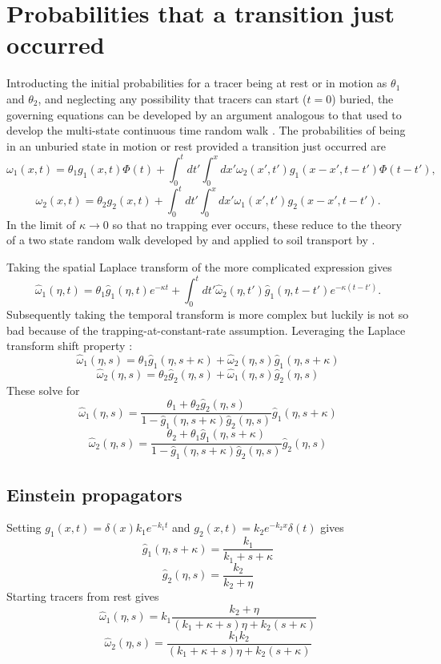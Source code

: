 \documentclass[11pt]{article}
\newcommand\be{\begin{equation}} %
\newcommand\ee{\end{equation}}   %
\begin{document}
\section{Probabilities that a transition just occurred}
Introducting the initial probabilities for a tracer being at rest or in motion as $\theta_1$ and $\theta_2$, and neglecting any possibility that tracers can start ($t=0$) buried, the governing equations can be developed by an argument analogous to that used to develop the multi-state continuous time random walk \citep[e.g.][]{Weiss1994}. The probabilities of being in an unburied state in motion or rest provided a transition just occurred are
\be \omega_1(x,t) = \theta_1 g_1(x,t)\Phi(t) + \int_0^t dt' \int_0^x dx' \omega_2(x',t')g_1(x-x',t-t')\Phi(t-t'), \ee
\be \omega_2(x,t) = \theta_2 g_2(x,t) + \int_0^t dt' \int_0^x dx' \omega_1(x',t')g_2(x-x',t-t').\ee
In the limit of $\kappa \rightarrow 0$ so that no trapping ever occurs, these reduce to the theory of a two state random walk developed by \citet{Weiss1976} and applied to soil transport by \citet{Lisle1998}.

Taking the spatial Laplace transform of the more complicated expression gives
\be \hat{\omega}_1(\eta,t) = \theta_1 \hat{g}_1(\eta,t)e^{-\kappa t} + \int_0^t dt' \hat{\omega}_2(\eta,t')\hat{g}_1(\eta,t-t')e^{-\kappa(t-t')}. \ee
Subsequently taking the temporal transform is more complex but luckily is not so bad because of the trapping-at-constant-rate assumption. Leveraging the Laplace transform shift property \citep[e.g.][]{Arfken1985}:
\be 
\hat{\omega}_1(\eta,s) = \theta_1 \hat{g}_1(\eta, s + \kappa) + \hat{\omega}_2(\eta,s)\hat{g}_1(\eta,s+\kappa)
\ee
\be \hat{\omega}_2(\eta,s) = \theta_2 \hat{g}_2(\eta,s) + \hat{\omega}_1(\eta,s)\hat{g}_2(\eta,s)\ee
These solve for 
\be \hat{\omega}_1(\eta,s) = \frac{\theta_1 + \theta_2 \hat{g}_2(\eta,s)}{1- \hat{g}_1(\eta,s+\kappa) \hat{g}_2(\eta,s)}\hat{g}_1(\eta,s+\kappa)\ee
\be \hat{\omega}_2(\eta,s) = \frac{\theta_2 + \theta_1 \hat{g}_1(\eta,s+\kappa)}{1- \hat{g}_1(\eta,s+\kappa) \hat{g}_2(\eta,s)} \hat{g}_2(\eta,s)\ee
\subsection{Einstein propagators}
Setting $g_1(x,t) = \delta(x)k_1e^{-k_1t}$ and $g_2(x,t) = k_2e^{-k_2 x}\delta(t)$ gives
\be \hat{g}_1(\eta,s+\kappa) = \frac{k_1}{k_1+s+\kappa}\ee
\be \hat{g}_2(\eta,s) = \frac{k_2}{k_2 + \eta}\ee
Starting tracers from rest gives 
\be \hat{\omega}_1(\eta,s) = k_1 \frac{k_2 + \eta}{(k_1 + \kappa + s)\eta + k_2 (s+\kappa)}\ee
\be \hat{\omega}_2(\eta,s) =  \frac{k_1k_2}{(k_1 + \kappa + s)\eta + k_2 (s+\kappa)} \ee
\end{document}
